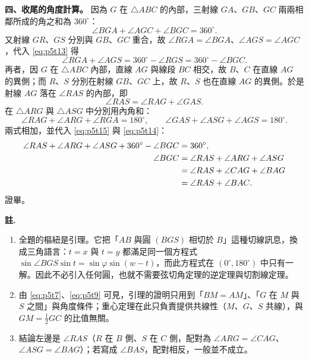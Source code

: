 \textbf{四、收尾的角度計算。}
因為 $G$ 在 $\triangle{ABC}$ 的內部，三射線 $GA$、$GB$、$GC$ 兩兩相鄰所成的角之和為 $360^{\circ}$：
\begin{equation}\label{eq:p5t13}
  \angle{BGA}+\angle{AGC}+\angle{BGC}=360^{\circ}.
\end{equation}
又射線 $GR$、$GS$ 分別與 $GB$、$GC$ 重合，故 $\angle{RGA}=\angle{BGA}$、$\angle{AGS}=\angle{AGC}$，代入 \eqref{eq:p5t13} 得
\begin{equation}\label{eq:p5t14}
  \angle{RGA}+\angle{AGS}=360^{\circ}-\angle{RGS}=360^{\circ}-\angle{BGC}.
\end{equation}
再者，因 $G$ 在 $\triangle{ABC}$ 內部，直線 $AG$ 與線段 $BC$ 相交，故 $B$、$C$ 在直線 $AG$ 的異側；而 $R$、$S$ 分別在射線 $GB$、$GC$ 上，故 $R$、$S$ 也在直線 $AG$ 的異側。於是射線 $AG$ 落在 $\angle{RAS}$ 的內部，即
\begin{equation}\label{eq:p5t15}
  \angle{RAS}=\angle{RAG}+\angle{GAS}.
\end{equation}
在 $\triangle{ARG}$ 與 $\triangle{ASG}$ 中分別用內角和：
\begin{equation}\label{eq:p5t16}
  \angle{RAG}+\angle{ARG}+\angle{RGA}=180^{\circ},\qquad
  \angle{GAS}+\angle{ASG}+\angle{AGS}=180^{\circ}.
\end{equation}
兩式相加，並代入 \eqref{eq:p5t15} 與 \eqref{eq:p5t14}：
\begin{align}
  \angle{RAS}+\angle{ARG}+\angle{ASG}+360^{\circ}-\angle{BGC}&=360^{\circ},\notag\\
  \angle{BGC}&=\angle{RAS}+\angle{ARG}+\angle{ASG}\notag\\
  &=\angle{RAS}+\angle{CAG}+\angle{BAG}\notag\\
  &=\angle{RAS}+\angle{BAC}.
\end{align}
證畢。

\medskip
\textbf{註.}
\begin{enumerate}
  \item 全題的樞紐是引理。它把「$AB$ 與圓 $(BGS)$ 相切於 $B$」這種切線訊息，換成三角語言：$t=x$ 與 $t=y$ 都滿足同一個方程式 $\sin\angle{BGS}\sin t=\sin\varphi\sin(w-t)$，而此方程式在 $(0^{\circ},180^{\circ})$ 中只有一解。因此不必引入任何圓，也就不需要弦切角定理的逆定理與切割線定理。
  \item 由 \eqref{eq:p5t7}、\eqref{eq:p5t9} 可見，引理的證明只用到「$BM=AM$」、「$G$ 在 $M$ 與 $S$ 之間」與角度條件；重心定理在此只負責提供共線性（$M$、$G$、$S$ 共線），與 $GM=\frac{1}{2}GC$ 的比值無關。
  \item 結論左邊是 $\angle{RAS}$（$R$ 在 $B$ 側、$S$ 在 $C$ 側，配對為 $\angle{ARG}=\angle{CAG}$、$\angle{ASG}=\angle{BAG}$）；若寫成 $\angle{BAS}$，配對相反，一般並不成立。
\end{enumerate}
